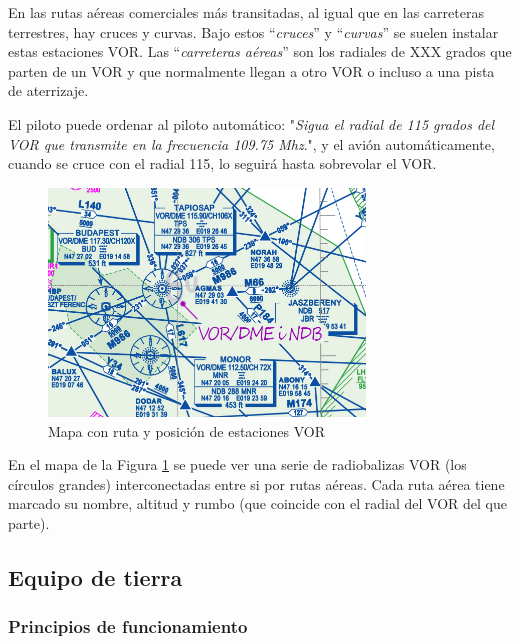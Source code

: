 En las rutas a\'ereas comerciales m\'as transitadas, al igual que en las carreteras terrestres, hay cruces y curvas. Bajo estos ``\emph{cruces}'' y ``\emph{curvas}'' se suelen instalar estas estaciones VOR. Las ``\emph{carreteras a\'ereas}'' son los radiales de XXX grados que parten de un VOR y que normalmente llegan a otro VOR o incluso a una pista de aterrizaje.

El piloto puede ordenar al piloto autom\'atico: "\textit{Sigua el radial de 115 grados del VOR que transmite en la frecuencia 109.75 Mhz}.", y el avi\'on autom\'aticamente, cuando se cruce con el radial 115, lo seguir\'a hasta sobrevolar el VOR.

\begin{figure} [!hbt]
 \centering
 \includegraphics[width=0.750\textwidth]{06.radionavegacion/Imagenes/06.02.vor.imagenes/mapa_vor.jpg}
 \caption{Mapa con ruta y posici\'on de estaciones VOR}
 \label{Mapa_estaciones_VOR}
\end{figure}

En el mapa de la Figura  \ref{Mapa_estaciones_VOR} se puede ver una serie de radiobalizas VOR (los c\'irculos grandes) interconectadas entre si por rutas a\'ereas. Cada ruta a\'erea tiene marcado su nombre, altitud y rumbo (que coincide con el radial del VOR del que parte).


\subsection{Equipo de tierra}

\subsubsection{Principios de funcionamiento }

